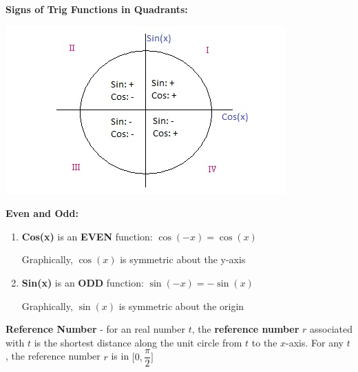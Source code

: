 \documentclass[12pt]{article}
\begin{document}
\newpage

\textbf{Signs of Trig Functions in Quadrants:}

\centerline{\includegraphics{QuadrantSignsTrigFunctions.jpg}}

\textbf{Even and Odd:}

\begin{enumerate}
\item \textbf{Cos(x)} is an \textbf{EVEN} function: $\cos(-x) = \cos(x)$ 

Graphically, $\cos(x)$ is symmetric about the y-axis
\item \textbf{Sin(x)} is an \textbf{ODD} function: $\sin(-x) = -\sin(x)$

Graphically, $\sin(x)$ is symmetric about the origin
\end{enumerate}

\newpage

\textbf{Reference Number} - for an real number $t$, the \textbf{reference number} $r$ associated with $t$ is the shortest distance along the unit circle from $t$ to the $x$-axis. For any $t$, the reference number $r$ is in $\Big[0, \dfrac{\pi}{2}\Big]$
\end{document}
